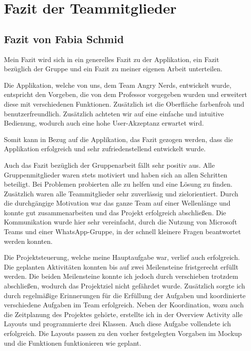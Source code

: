 \section{Fazit der Teammitglieder}
\label{instal}

\subsection{Fazit von Fabia Schmid}

Mein Fazit wird sich in ein generelles Fazit zu der Applikation, ein Fazit bezüglich der Gruppe und ein Fazit zu meiner eigenen Arbeit unterteilen.

Die Applikation, welche von uns, dem Team Angry Nerds, entwickelt wurde, entspricht den Vorgeben, die von dem Professor vorgegeben wurden und erweitert diese mit verschiedenen Funktionen. Zusätzlich ist die Oberfläche farbenfroh und benutzerfreundlich. Zusätzlich achteten wir auf eine einfache und intuitive Bedienung, wodurch auch eine hohe User-Akzeptanz erwartet wird.

Somit kann in Bezug auf die Applikation, das Fazit gezogen werden, dass die Applikation erfolgreich und sehr zufriedenstellend entwickelt wurde.

Auch das Fazit bezüglich der Gruppenarbeit fällt sehr positiv aus. Alle Gruppenmitglieder waren stets motiviert und haben sich an allen Schritten beteiligt. Bei Problemen probierten alle zu helfen und eine Lösung zu finden. Zusätzlich waren alle Teammitglieder sehr zuverlässig und zielorientiert. Durch die durchgängige Motivation war das ganze Team auf einer Wellenlänge und konnte gut zusammenarbeiten und das Projekt erfolgreich abschließen. Die Kommunikation wurde hier sehr vereinfacht, durch die Nutzung von Microsoft Teams und einer WhatsApp-Gruppe, in der schnell kleinere Fragen beantwortet werden konnten.

Die Projektsteuerung, welche meine Hauptaufgabe war, verlief auch erfolgreich. Die geplanten Aktivitäten konnten bis auf zwei Meilensteine fristgerecht erfüllt werden. Die beiden Meilensteine konnte ich jedoch durch verschieben trotzdem abschließen, wodurch das Projektziel nicht gefährdet wurde. Zusätzlich sorgte ich durch regelmäßige Erinnerungen für die Erfüllung der Aufgaben und koordinierte verschiedene Aufgaben im Team erfolgreich. Neben der Koordination, wozu auch die Zeitplanung des Projektes gehörte, erstellte ich in der Overview Activity alle Layouts und programmierte drei Klassen. Auch diese Aufgabe vollendete ich erfolgreich. Die Layouts passen zu den vorher festgelegten Vorgaben im Mockup und die Funktionen funktionieren wie geplant.

